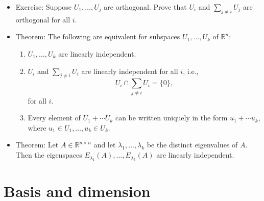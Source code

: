 \documentclass{amsart}
\newcommand{\RR}{\mathbb{R}}
\begin{document}
\begin{itemize}
\item Exercise: Suppose $U_1,\ldots,U_j$ are orthogonal. Prove that $U_i$ and $\sum_{j\neq i}U_j$ are orthogonal for all $i$.

  \item Theorem: The following are equivalent for subspaces $U_1,\ldots,U_k$ of $\RR^n$:
  \begin{enumerate}
    \item $U_1,\ldots,U_k$ are linearly independent.
    \item $U_i$ and $\sum_{j\neq i} U_i$ are linearly independent for all $i$, i.e.,
  $$
  U_i\cap \sum_{j\neq i} U_i = \{0\},
  $$
  for all $i$.
  \item Every element of $U_1+\cdots U_k$ can be written uniquely in the form $u_1+\cdots u_k$, where $u_1\in U_1,\ldots,u_k\in U_k$.
  \end{enumerate}

  \item Theorem: Let $A\in\RR^{n\times n}$ and let $\lambda_1,\ldots,\lambda_k$ be the distinct eigenvalues of $A$.
  Then the eigenspaces $E_{\lambda_1}(A),\ldots,E_{\lambda_k}(A)$ are linearly independent.
\end{itemize}

\section{Basis and dimension}
\end{document}
